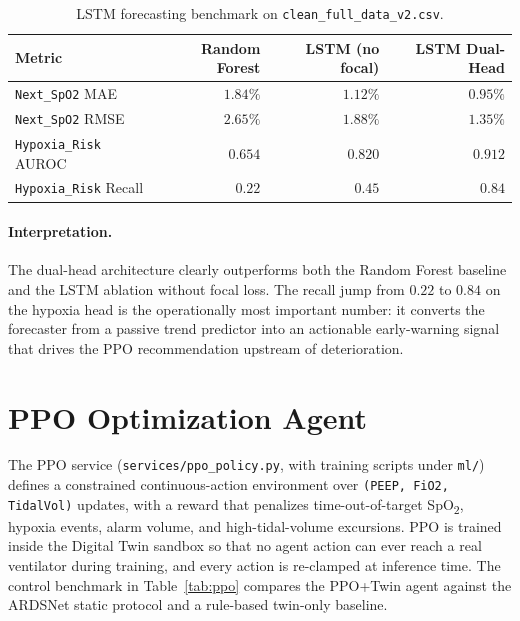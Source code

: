 \documentclass[12pt,a4paper,oneside]{report}
\begin{document}
\begin{table}[h]
\centering
\caption{LSTM forecasting benchmark on \texttt{clean\_full\_data\_v2.csv}.}
\label{tab:lstm}
\begin{tabular}{lrrr}
\toprule
\textbf{Metric} & \textbf{Random Forest} & \textbf{LSTM (no focal)} & \textbf{LSTM Dual-Head}\\
\midrule
\texttt{Next\_SpO2} MAE   & $1.84\%$ & $1.12\%$ & $\mathbf{0.95\%}$\\
\texttt{Next\_SpO2} RMSE  & $2.65\%$ & $1.88\%$ & $\mathbf{1.35\%}$\\
\texttt{Hypoxia\_Risk} AUROC & $0.654$ & $0.820$ & $\mathbf{0.912}$\\
\texttt{Hypoxia\_Risk} Recall & $0.22$ & $0.45$ & $\mathbf{0.84}$\\
\bottomrule
\end{tabular}
\end{table}

\paragraph{Interpretation.} The dual-head architecture clearly outperforms both the Random Forest baseline and the LSTM ablation without focal loss. The recall jump from $0.22$ to $0.84$ on the hypoxia head is the operationally most important number: it converts the forecaster from a passive trend predictor into an actionable early-warning signal that drives the PPO recommendation upstream of deterioration.

\section{PPO Optimization Agent}
The PPO service (\texttt{services/ppo\_policy.py}, with training scripts under \texttt{ml/}) defines a constrained continuous-action environment over \texttt{(PEEP, FiO2, TidalVol)} updates, with a reward that penalizes time-out-of-target SpO\textsubscript{2}, hypoxia events, alarm volume, and high-tidal-volume excursions. PPO is trained inside the Digital Twin sandbox so that no agent action can ever reach a real ventilator during training, and every action is re-clamped at inference time. The control benchmark in Table~\ref{tab:ppo} compares the PPO+Twin agent against the ARDSNet static protocol and a rule-based twin-only baseline.
\end{document}
